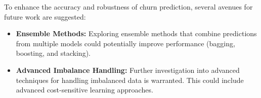 \documentclass[12pt]{article}
\begin{document}
To enhance the accuracy and robustness of churn prediction, several avenues for future work are suggested:
\begin{itemize}
    \item \textbf{Ensemble Methods:} Exploring ensemble methods that combine predictions from multiple models could potentially improve performance (bagging, boosting, and stacking).
    \item \textbf{Advanced Imbalance Handling:} Further investigation into advanced techniques for handling imbalanced data is warranted. This could include advanced cost-sensitive learning approaches.
\end{itemize}
\end{document}
